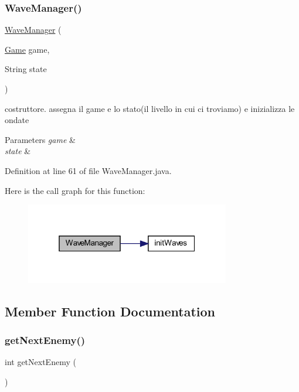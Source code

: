 \subsubsection{\texorpdfstring{Wave\+Manager()}{WaveManager()}}
{\footnotesize\ttfamily \hyperlink{classmanagers_1_1_wave_manager}{Wave\+Manager} (\begin{DoxyParamCaption}\item[{\hyperlink{classprogetto_1_1_game}{Game}}]{game,  }\item[{String}]{state }\end{DoxyParamCaption})}



costruttore. assegna il game e lo stato(il livello in cui ci troviamo) e inizializza le ondate 


\begin{DoxyParams}{Parameters}
{\em game} & \\
\hline
{\em state} & \\
\hline
\end{DoxyParams}


Definition at line 61 of file Wave\+Manager.\+java.

Here is the call graph for this function\+:
\nopagebreak
\begin{figure}[H]
\begin{center}
\leavevmode
\includegraphics[width=253pt]{classmanagers_1_1_wave_manager_a4f9054a370c040f84d220fce947314f2_cgraph}
\end{center}
\end{figure}


\subsection{Member Function Documentation}
\mbox{\label{classmanagers_1_1_wave_manager_aa05f286f626db3fc63273f5c5cd64bca}} 
\subsubsection{\texorpdfstring{get\+Next\+Enemy()}{getNextEnemy()}}
{\footnotesize\ttfamily int get\+Next\+Enemy (\begin{DoxyParamCaption}{ }\end{DoxyParamCaption})}



